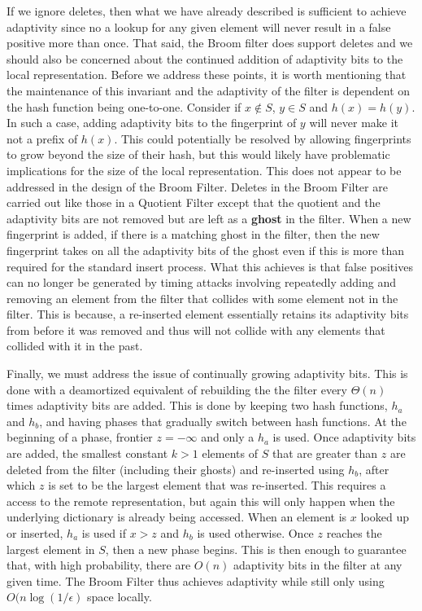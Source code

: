 \documentclass[../paper.tex]{subfiles}
\begin{document}
	 If we ignore deletes, then what we have already described is sufficient to achieve adaptivity since no a lookup for any given element will never result in a false positive more than once.  That said, the Broom filter does support deletes and we should also be concerned about the continued addition of adaptivity bits to the local representation.  Before we address these points, it is worth mentioning that the maintenance of this invariant and the adaptivity of the filter is dependent on the hash function being one-to-one.  Consider if $x \notin S$, $y \in S$ and  $h(x) = h(y)$.  In such a case, adding adaptivity bits to the fingerprint of $y$ will never make it not a prefix of $h(x)$.  This could potentially be resolved by allowing fingerprints to grow beyond the size of their hash, but this would likely have problematic implications for the size of the local representation.  This does not appear to be addressed in the design of the Broom Filter.  Deletes in the Broom Filter are carried out like those in a Quotient Filter except that the quotient and the adaptivity bits are not removed but are left as a {\bf ghost} in the filter.  When a new fingerprint is added, if there is a matching ghost in the filter, then the new fingerprint takes on all the adaptivity bits of the ghost even  if this is more than required for the standard insert process.  What this achieves is that false positives can no longer be generated by timing attacks involving repeatedly adding and removing an element from the filter that collides with some element not in the filter.  This is because, a re-inserted element essentially retains its adaptivity bits from before it was removed and thus will not collide with any elements that collided with it in the past.   
	 
	 Finally, we must address the issue of continually growing adaptivity bits.  This is done with a deamortized equivalent of rebuilding the the filter every $\Theta (n)$ times adaptivity bits are added.  This is done by keeping two hash functions, $h_a$ and $h_b$, and having phases that gradually switch between hash functions.  At the beginning of a phase, frontier $z = -\infty$ and only a $h_a$ is used.  Once adaptivity bits are added, the smallest constant $k > 1$ elements of $S$ that are greater than $z$ are deleted from the filter (including their ghosts) and re-inserted using $h_b$, after which $z$ is set to be the largest element that was re-inserted.  This requires a access to the remote representation, but again this will only happen when the underlying dictionary is already being accessed.  When an element is $x$ looked up or inserted, $h_a$ is used if $x > z$ and $h_b$ is used otherwise.  Once $z$ reaches the largest element in $S$, then a new phase begins.  This is then enough to guarantee that, with high probability, there are $O(n)$ adaptivity bits in the filter at any given time.  The Broom Filter thus achieves adaptivity while still only using $O(n \log (1/\epsilon)$ space locally.  
\end{document}
